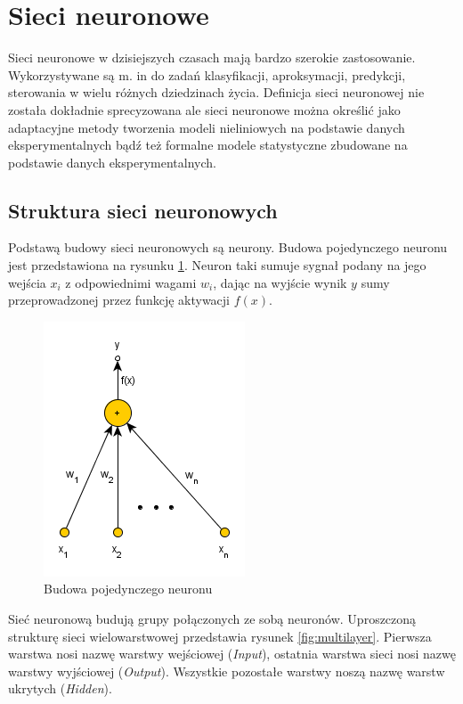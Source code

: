 \newpage
\section{Sieci neuronowe} 

Sieci neuronowe w dzisiejszych czasach mają bardzo szerokie zastosowanie. Wykorzystywane są m. in do zadań klasyfikacji, aproksymacji, predykcji, sterowania w wielu różnych dziedzinach życia. Definicja sieci neuronowej nie została dokładnie sprecyzowana ale sieci neuronowe można określić jako adaptacyjne metody tworzenia modeli nieliniowych na podstawie danych eksperymentalnych bądź też formalne modele statystyczne zbudowane na podstawie danych eksperymentalnych\cite{Jankowski}.
 
\subsection{Struktura sieci neuronowych}
Podstawą budowy sieci neuronowych są neurony. Budowa pojedynczego neuronu jest przedstawiona na rysunku \ref{fig:neuron}. Neuron taki sumuje sygnał podany na jego wejścia $x_i$ z odpowiednimi wagami $w_i$, dając na wyjście wynik $y$ sumy przeprowadzonej przez funkcję aktywacji $f(x)$.
\begin{figure}[ht!]
	\centering
	\includegraphics[scale=0.8]{images/single_neuron.png}
	\caption{Budowa pojedynczego neuronu}
	\label{fig:neuron}
\end{figure}

Sieć neuronową budują grupy połączonych ze sobą neuronów. Uproszczoną strukturę sieci wielowarstwowej przedstawia rysunek \ref{fig:multilayer}. Pierwsza warstwa nosi nazwę warstwy wejściowej (\textit{Input}), ostatnia warstwa sieci nosi nazwę warstwy wyjściowej (\textit{Output}). Wszystkie pozostałe warstwy noszą nazwę warstw ukrytych (\textit{Hidden}).

